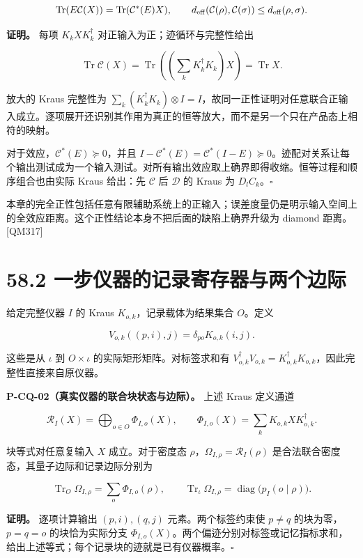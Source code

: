 \documentclass[
  11pt,
  oneside]{book}
\begin{document}
\[
\operatorname{Tr}(E\mathcal C(X))=\operatorname{Tr}(\mathcal C^*(E)X),\qquad
d_{\rm eff}(\mathcal C(\rho),\mathcal C(\sigma))\le d_{\rm eff}(\rho,\sigma).
\]

\textbf{证明。} 每项 \(K_kXK_k^\dagger\)
对正输入为正；迹循环与完整性给出

\[
\operatorname{Tr}\mathcal C(X)
=\operatorname{Tr}\!\left(\left(\sum_kK_k^\dagger K_k\right)X\right)
=\operatorname{Tr}X.
\]

放大的 Kraus 完整性为
\(\sum_k(K_k^\dagger K_k)\otimes I=I\)，故同一正性证明对任意联合正输入成立。逐项展开还识别其作用为真正的恒等放大，而不是另一个只在产品态上相符的映射。

对于效应，\(\mathcal C^*(E)\succeq0\)，并且
\(I-\mathcal C^*(E)=\mathcal C^*(I-E)\succeq0\)。迹配对关系让每个输出测试成为一个输入测试。对所有输出效应取上确界即得收缩。恒等过程和顺序组合也由实际
Kraus 给出：先 \(\mathcal C\) 后 \(\mathcal D\) 的 Kraus 为
\(D_lC_k\)。\(\square\)

本章的完全正性包括任意有限辅助系统上的正输入；误差度量仍是明示输入空间上的全效应距离。这个正性结论本身不把后面的缺陷上确界升级为
diamond 距离。{[}QM317{]}

\section{58.2 一步仪器的记录寄存器与两个边际}

给定完整仪器 \(I\) 的 Kraus \(K_{o,k}\)，记录载体为结果集合 \(O\)。定义

\[
V_{o,k}((p,i),j)=\delta_{po}K_{o,k}(i,j).
\]

这些是从 \(\iota\) 到 \(O\times\iota\) 的实际矩形矩阵。对标签求和有
\(V_{o,k}^\dagger V_{o,k}=K_{o,k}^\dagger K_{o,k}\)，因此完整性直接来自原仪器。

\protect\hypertarget{p-cq-02}{}{}

\textbf{P-CQ-02（真实仪器的联合块状态与边际）。} 上述 Kraus 定义通道

\[
\mathcal R_I(X)=\bigoplus_{o\in O}\Phi_{I,o}(X),\qquad
\Phi_{I,o}(X)=\sum_kK_{o,k}XK_{o,k}^\dagger.
\]

块等式对任意复输入 \(X\) 成立。对于密度态
\(\rho\)，\(\Omega_{I,\rho}=\mathcal R_I(\rho)\)
是合法联合密度态，其量子边际和记录边际分别为

\[
\operatorname{Tr}_{O}\Omega_{I,\rho}=\sum_o\Phi_{I,o}(\rho),\qquad
\operatorname{Tr}_{\iota}\Omega_{I,\rho}
=\operatorname{diag}\bigl(p_I(o\mid\rho)\bigr).
\]

\textbf{证明。} 逐项计算输出 \((p,i),(q,j)\) 元素。两个标签约束使
\(p\ne q\) 的块为零，\(p=q=o\) 的块恰为实际分支
\(\Phi_{I,o}(X)\)。两个偏迹分别对标签或记忆指标求和，给出上述等式；每个记录块的迹就是已有仪器概率。\(\square\)
\end{document}
